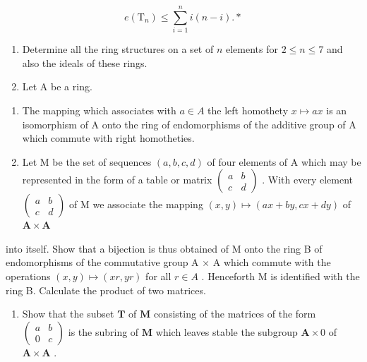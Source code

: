 \[
e (\mathrm{T} _ {n}) \leqslant \sum_ {i = 1} ^ {n} i (n - i). *
\]

\BourbakiExercisesSection

\begin{enumerate}
\def\labelenumi{\arabic{enumi}.}
\item
  Determine all the ring structures on a set of \(n\) elements for \(2 \leqslant n \leqslant 7\) and also the ideals of these rings.
\item
  Let A be a ring.
\end{enumerate}

\begin{enumerate}
\def\labelenumi{(\alph{enumi})}
\item
  The mapping which associates with \(a \in A\) the left homothety \(x \mapsto ax\) is an isomorphism of A onto the ring of endomorphisms of the additive group of A which commute with right homotheties.
\item
  Let M be the set of sequences \((a, b, c, d)\) of four elements of A which may be represented in the form of a table or matrix \(\begin{pmatrix} a & b \\ c & d \end{pmatrix}\) . With every element \(\begin{pmatrix} a & b \\ c & d \end{pmatrix}\) of M we associate the mapping \((x, y) \mapsto (ax + by, cx + dy)\) of \(\mathbf{A} \times \mathbf{A}\)
\end{enumerate}

into itself. Show that a bijection is thus obtained of M onto the ring B of endomorphisms of the commutative group A × A which commute with the operations \((x, y) \mapsto (xr, yr)\) for all \(r \in A\) . Henceforth M is identified with the ring B. Calculate the product of two matrices.

\begin{enumerate}
\def\labelenumi{(\alph{enumi})}
\setcounter{enumi}{2}
\tightlist
\item
  Show that the subset \(\mathbf{T}\) of \(\mathbf{M}\) consisting of the matrices of the form \(\begin{pmatrix} a & b \\ 0 & c \end{pmatrix}\) is the subring of \(\mathbf{M}\) which leaves stable the subgroup \(\mathbf{A} \times 0\) of \(\mathbf{A} \times \mathbf{A}\) .
\end{enumerate}

